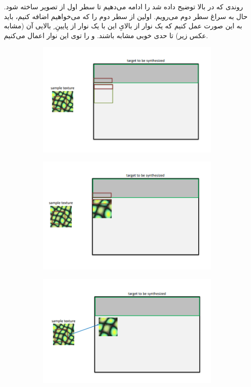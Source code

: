 \documentclass[a4paper,12pt]{article}
\begin{document}
روندی که در بالا توضیح داده شد را ادامه می‌دهیم تا سطر اول از تصویر
ساخته شود. حال به سراغ سطر دوم می‌رویم. اولین 
از سطر دوم را که می‌خواهیم اضافه کنیم،‌ باید به این صورت عمل کنیم که یک نوار از بالایِ این
با یک نوار از پایینِ
ِ
بالایی آن (مشابه عکس زیر) تا حدی خوبی مشابه باشند. و 
را توی این نوار اعمال می‌‌کنیم.
\begin{figure}[H]
	\centering
	\begin{subfigure}{0.33\textwidth}
		\centering
		\includegraphics[width=\textwidth]{9.png}
	\end{subfigure}%
	\begin{subfigure}{0.33\textwidth}
		\centering
		\includegraphics[width=\textwidth]{8.png}
	\end{subfigure}%
	\begin{subfigure}{0.33\textwidth}
		\centering
		\includegraphics[width=\textwidth]{7.png}

\end{subfigure}
\end{figure}
\end{document}
